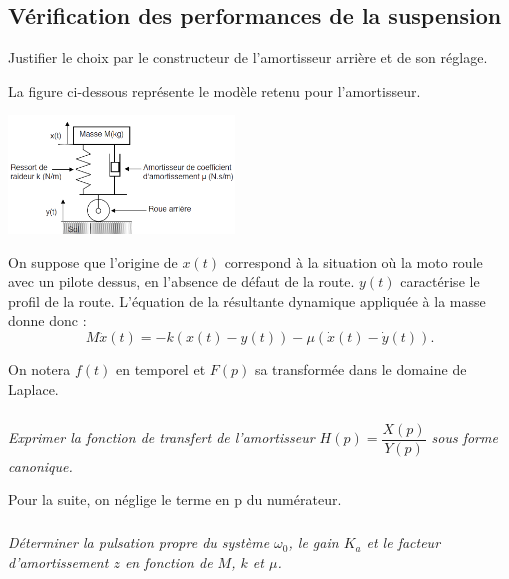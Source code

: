 \documentclass[10pt,fleqn]{article} %
\begin{document}
\begin{multicols}{2}
\subsection*{Vérification des performances de la suspension}

\begin{obj}
Justifier le choix par le constructeur de l’amortisseur arrière et de son réglage.
\end{obj}

La figure ci-dessous représente %
 le modèle retenu pour l'amortisseur. 

\begin{center}
       \includegraphics[width=6cm]{images/fig_05}

\end{center}

On suppose que l’origine de $x(t)$ correspond à la situation où la moto roule avec un pilote dessus, en l’absence de défaut de la route. $y(t)$ caractérise le profil de la route.
L’équation de la résultante dynamique appliquée à la masse donne donc :
$$M\ddot{x}(t)= - k\left(x(t)-y(t)\right) -\mu \left(\dot{x}(t)-\dot{y}(t) \right).$$

On notera $f(t)$ en temporel et $F(p)$ sa transformée dans le domaine de Laplace.



\subparagraph{}
\textit{Exprimer la fonction de transfert de l’amortisseur $H(p)=\dfrac{X(p)}{Y(p)}$
sous forme canonique.}
\ifprof
\begin{corrige}
\end{corrige}
\else
\fi

Pour la suite, on néglige le terme en p du numérateur.


\subparagraph{}
\textit{Déterminer la pulsation propre du système $\omega_0$, le gain $K_a$ et le facteur d’amortissement $z$ en
fonction de $M$, $k$ et $\mu$.}
\ifprof
\begin{corrige}
\end{corrige}
\else
\fi


\end{multicols}
\end{document}
